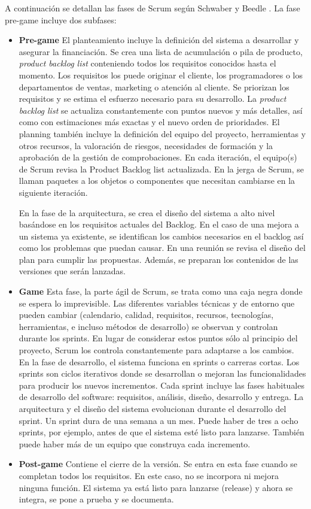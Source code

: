 A continuación se detallan las fases de Scrum según Schwaber y Beedle \cite{Schwaber}. La fase pre-game incluye dos subfases:
\begin{itemize}

\item \textbf{Pre-game}
El planteamiento incluye la definición del sistema a desarrollar y asegurar la financiación. Se crea una lista de acumulación o pila de producto, \textit{product backlog list} conteniendo todos los requisitos conocidos hasta el momento. Los requisitos los puede originar el cliente, los programadores o los departamentos de ventas, marketing o atención al cliente. Se priorizan los requisitos y se estima el esfuerzo necesario para su desarrollo. La \textit{product backlog list} se actualiza constantemente con puntos nuevos y más detalles, así como con estimaciones más exactas y el nuevo orden de prioridades. El planning también incluye la definición del equipo del proyecto, herramientas y otros recursos, la valoración de riesgos, necesidades de formación y la aprobación de la gestión de comprobaciones. En cada iteración, el equipo(s) de Scrum revisa la Product Backlog list actualizada. En la jerga de Scrum, se llaman paquetes a los objetos o componentes que necesitan cambiarse en la siguiente iteración.

En la fase de la arquitectura, se crea el diseño del sistema a alto nivel basándose en los requisitos actuales del Backlog. En el caso de una mejora a un sistema ya existente, se identifican los cambios necesarios en el backlog así como los problemas que puedan causar. En una reunión se revisa el diseño del plan para cumplir las propuestas. Además, se preparan los contenidos de las versiones que serán lanzadas. 

\item \textbf{Game}
Esta fase, la parte ágil de Scrum, se trata como una caja negra donde se espera lo imprevisible. Las diferentes variables técnicas y de entorno que pueden cambiar (calendario, calidad, requisitos, recursos, tecnologías, herramientas, e incluso métodos de desarrollo) se observan y controlan durante los sprints. En lugar de considerar estos puntos sólo al principio del proyecto, Scrum los controla constantemente para adaptarse a los cambios. En la fase de desarrollo, el sistema funciona en sprints o carreras cortas. Los sprints son ciclos iterativos donde se desarrollan o mejoran las funcionalidades para producir los nuevos incrementos. Cada sprint incluye las fases habituales de desarrollo del software: requisitos, análisis, diseño, desarrollo y entrega. La arquitectura y el diseño del sistema evolucionan durante el desarrollo del sprint. Un sprint dura de una semana a un mes. Puede haber de tres a ocho sprints, por ejemplo, antes de que el sistema esté listo para lanzarse. También puede haber más de un equipo que construya cada incremento.

\item \textbf{Post-game}
Contiene el cierre de la versión. Se entra en esta fase cuando se completan todos los requisitos. En este caso, no se incorpora ni mejora ninguna función. El sistema ya está listo para lanzarse (release) y ahora se integra, se pone a prueba y se documenta.
\end{itemize}


